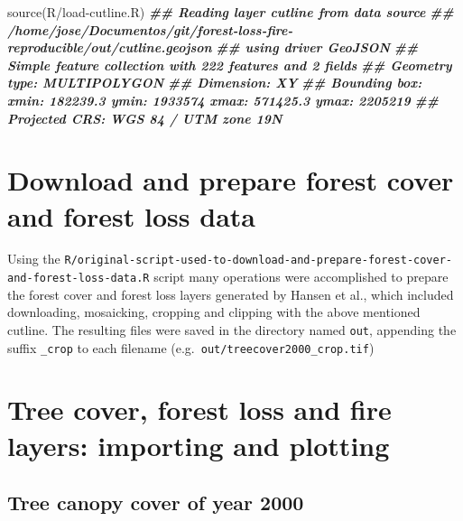 \documentclass[10pt,landscape,a3paper]{article}
\newenvironment{Shaded}{\begin{snugshade}}{\end{snugshade}}
\newcommand{\DocumentationTok}[1]{\textcolor[rgb]{0.56,0.35,0.01}{\textbf{\textit{#1}}}}
\newcommand{\FunctionTok}[1]{\textcolor[rgb]{0.00,0.00,0.00}{#1}}
\newcommand{\NormalTok}[1]{#1}
\newcommand{\StringTok}[1]{\textcolor[rgb]{0.31,0.60,0.02}{#1}}
\begin{document}
\begin{Shaded}
\begin{Highlighting}[]
\FunctionTok{source}\NormalTok{(}\StringTok{\textquotesingle{}R/load{-}cutline.R\textquotesingle{}}\NormalTok{)}
\DocumentationTok{\#\# Reading layer \textasciigrave{}cutline\textquotesingle{} from data source }
\DocumentationTok{\#\#   \textasciigrave{}/home/jose/Documentos/git/forest{-}loss{-}fire{-}reproducible/out/cutline.geojson\textquotesingle{} }
\DocumentationTok{\#\#   using driver \textasciigrave{}GeoJSON\textquotesingle{}}
\DocumentationTok{\#\# Simple feature collection with 222 features and 2 fields}
\DocumentationTok{\#\# Geometry type: MULTIPOLYGON}
\DocumentationTok{\#\# Dimension:     XY}
\DocumentationTok{\#\# Bounding box:  xmin: 182239.3 ymin: 1933574 xmax: 571425.3 ymax: 2205219}
\DocumentationTok{\#\# Projected CRS: WGS 84 / UTM zone 19N}
\end{Highlighting}
\end{Shaded}

\hypertarget{download-and-prepare-forest-cover-and-forest-loss-data}{%
\section{Download and prepare forest cover and forest loss
data}\label{download-and-prepare-forest-cover-and-forest-loss-data}}

Using the
\texttt{R/original-script-used-to-download-and-prepare-forest-cover-and-forest-loss-data.R}
script many operations were accomplished to prepare the forest cover and
forest loss layers generated by Hansen et al., which included
downloading, mosaicking, cropping and clipping with the above mentioned
cutline. The resulting files were saved in the directory named
\texttt{out}, appending the suffix \texttt{\_crop} to each filename
(e.g.~\texttt{out/treecover2000\_crop.tif})

\hypertarget{tree-cover-forest-loss-and-fire-layers-importing-and-plotting}{%
\section{Tree cover, forest loss and fire layers: importing and
plotting}\label{tree-cover-forest-loss-and-fire-layers-importing-and-plotting}}

\hypertarget{tree-canopy-cover-of-year-2000}{%
\subsection{Tree canopy cover of year
2000}\label{tree-canopy-cover-of-year-2000}}
\end{document}
